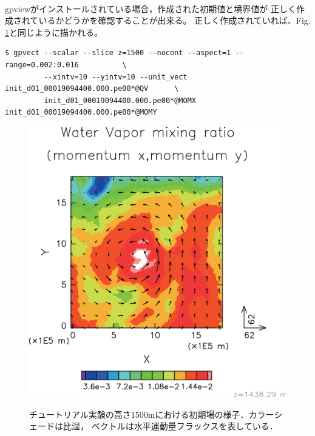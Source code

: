 \vspace{1cm}
 \hrulefill \\
gpviewがインストールされている場合，作成された初期値と境界値が
正しく作成されているかどうかを確認することが出来る。
正しく作成されていれば、Fig. \ref{fig:init}と同じように描かれる。

\begin{verbatim}
$ gpvect --scalar --slice z=1500 --nocont --aspect=1 --range=0.002:0.016          \
         --xintv=10 --yintv=10 --unit_vect init_d01_00019094400.000.pe00*@QV      \
         init_d01_00019094400.000.pe00*@MOMX init_d01_00019094400.000.pe00*@MOMY
\end{verbatim}


\begin{figure}[h]
\begin{center}
  \includegraphics[width=0.7\hsize]{./figure/init_qv-momxy.eps}\\
  \caption{チュートリアル実験の高さ1500mにおける初期場の様子．カラーシェードは比湿，
           ベクトルは水平運動量フラックスを表している．}
  \label{fig:init}
\end{center}
\end{figure}

